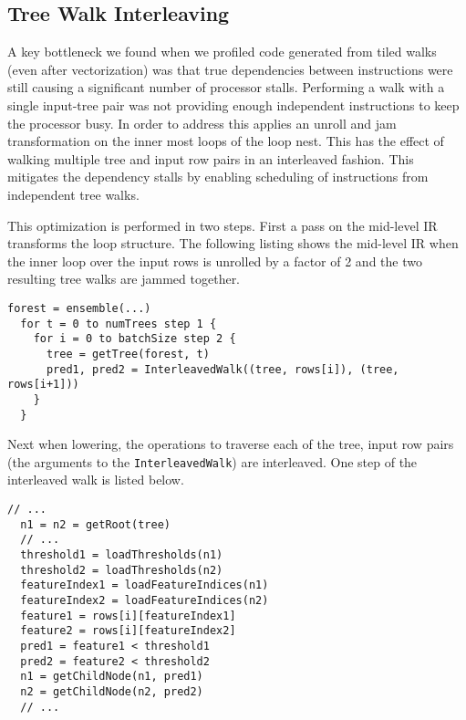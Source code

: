 \subsection{Tree Walk Interleaving}
A key bottleneck we found when we profiled code generated from tiled walks (even after vectorization) was that true dependencies between instructions were still causing
a significant number of processor stalls. Performing a walk with a single input-tree pair was not providing enough independent instructions to keep the processor busy. In order to address this \Treebeard{} applies an unroll and jam transformation on the inner most loops of the loop nest. This has 
the effect of walking multiple tree and input row pairs in an interleaved fashion. 
This mitigates the dependency stalls by enabling scheduling of instructions from independent tree walks. 

This optimization is performed in two steps. 
First a pass on the mid-level IR transforms the loop structure. 
The following listing shows the mid-level IR when the inner loop over the input rows is unrolled 
by a factor of 2 and the two resulting tree walks are jammed together.

\begin{lstlisting}[style=c++]
  forest = ensemble(...)
  for t = 0 to numTrees step 1 {
    for i = 0 to batchSize step 2 {
      tree = getTree(forest, t)
      pred1, pred2 = InterleavedWalk((tree, rows[i]), (tree, rows[i+1]))
    }
  }
\end{lstlisting}
Next when lowering, the operations to traverse each of the tree, input row pairs 
(the arguments to the \texttt{InterleavedWalk}) are interleaved. One step of the interleaved 
walk is listed below. 
\begin{lstlisting}[style=c++]
  // ... 
  n1 = n2 = getRoot(tree)
  // ...
  threshold1 = loadThresholds(n1)
  threshold2 = loadThresholds(n2)
  featureIndex1 = loadFeatureIndices(n1)
  featureIndex2 = loadFeatureIndices(n2)
  feature1 = rows[i][featureIndex1]
  feature2 = rows[i][featureIndex2]
  pred1 = feature1 < threshold1
  pred2 = feature2 < threshold2
  n1 = getChildNode(n1, pred1)
  n2 = getChildNode(n2, pred2)
  // ...
\end{lstlisting}

